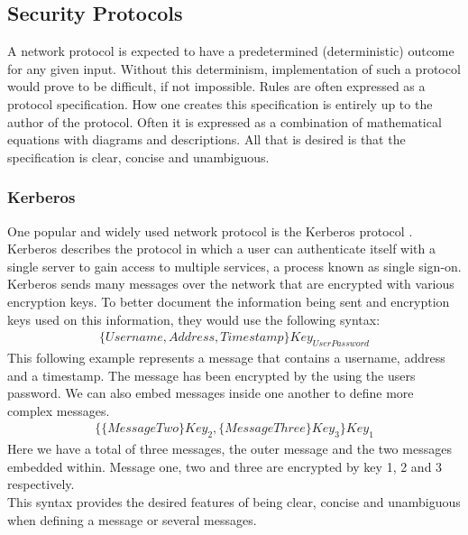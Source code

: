 \subsection{Security Protocols}
A network protocol is expected to have a predetermined (deterministic) outcome for any given input. Without this determinism, implementation of such a protocol would prove to be difficult, if not impossible. Rules are often expressed as a protocol specification. How one creates this specification is entirely up to the author of the protocol. Often it is expressed as a combination of mathematical equations with diagrams and descriptions.  All that is desired is that the specification is clear, concise and unambiguous.
\subsubsection{Kerberos}
One popular and widely used network protocol is the Kerberos protocol \cite{steiner1988kerberos}. Kerberos describes the protocol in which a user can authenticate itself with a single server to gain access to multiple services, a process known as single sign-on. Kerberos sends many messages over the network that are encrypted with various encryption keys. To better document the information being sent and encryption keys used on this information, they would use the following syntax:
$$
\begin{multlined}
 \{Username, Address, Timestamp\}Key_{UserPassword}
\end{multlined}
$$
This following example represents a message that contains a username, address and a timestamp. The message has been encrypted by the using the users password. We can also embed messages inside one another to define more complex messages.
$$
\begin{multlined}
 \{\{MessageTwo\}Key_{2}, \{MessageThree\}Key_{3}\}Key_1
\end{multlined}
$$
Here we have a total of three messages, the outer message and the two messages embedded within. Message one, two and three are encrypted by key 1, 2 and 3 respectively.
\\
This syntax provides the desired features of being clear, concise and unambiguous when defining  a message or several messages.

